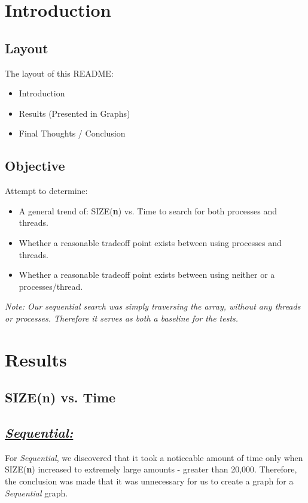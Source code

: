 \documentclass{article}
\title{\vspace{-0.5cm}\titletext}
\date{\vspace{-5ex}}
\begin{document}
    \maketitle
    \thispagestyle{fancy}
    \vspace{-1.0cm}

    \section{Introduction}
        \subsection{Layout}
            The layout of this README:
            \begin{itemize}
                \item Introduction
                \item Results (Presented in Graphs)
                \item Final Thoughts / Conclusion
            \end{itemize}
        \subsection{Objective}
            Attempt to determine:
            \begin{itemize}
                \item A general trend of: SIZE(\textbf{n}) vs. Time to search for both processes and threads.
                \item Whether a reasonable tradeoff point exists between using processes and threads.
                \item Whether a reasonable tradeoff point exists between using neither or a processes/thread.
            \end{itemize}
        \textit{Note: Our sequential search was simply traversing the array, without any threads or processes. Therefore it serves as both a baseline for the tests.}
    \pagebreak
    \section{Results}
        \subsection{SIZE(\textbf{n}) vs. Time}
            \subsection*{\textit{\underline{Sequential:}}}
                For \textit{Sequential}, we discovered that it took a noticeable amount of time only when SIZE(\textbf{n}) increased to extremely large amounts - greater than 20,000. 
                Therefore, the conclusion was made that it was unnecessary for us to create a graph for a \textit{Sequential} graph.
\end{document}

